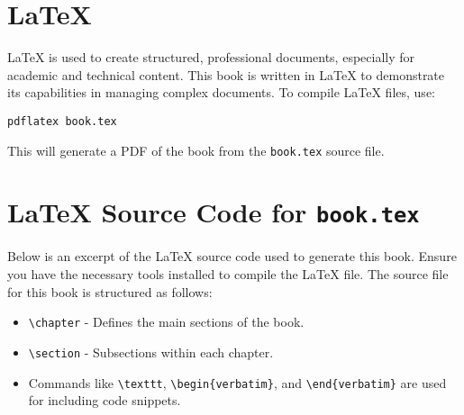 \section{LaTeX}
LaTeX is used to create structured, professional documents, especially for academic and technical content. This book is written in LaTeX to demonstrate its capabilities in managing complex documents. To compile LaTeX files, use:
\begin{verbatim}
pdflatex book.tex
\end{verbatim}
This will generate a PDF of the book from the \texttt{book.tex} source file.

\section{LaTeX Source Code for \texttt{book.tex}}
Below is an excerpt of the LaTeX source code used to generate this book. Ensure you have the necessary tools installed to compile the LaTeX file. The source file for this book is structured as follows:
\begin{itemize}
  \item \verb|\chapter| - Defines the main sections of the book.
  \item \verb|\section| - Subsections within each chapter.
  \item Commands like \verb|\texttt|, \verb|\begin{verbatim}|, and \verb|\end{verbatim}| are used for including code snippets.
\end{itemize}
